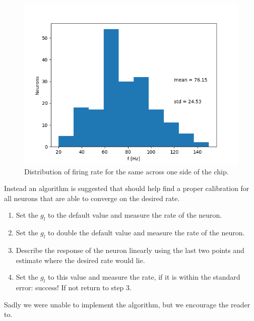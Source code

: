 \documentclass[10pt,a4paper]{article}
\begin{document}
\begin{figure}[ht]
    \centering
    \includegraphics[width=\textwidth]{figures/rate-distribution.png}
    \caption{Distribution of firing rate for the same across one side of the
    chip.}
    \label{fig:distribution}
\end{figure}

Instead an algorithm is suggested that should help find a proper calibration for
all neurons that are able to converge on the desired rate.
\begin{enumerate}
    \item Set the $g_l$ to the default value and measure the rate of the neuron.
    \item Set the $g_l$ to double the default value and measure the rate of the
        neuron.
    \item Describe the response of the neuron linearly using the last two
        points and estimate where the desired rate would lie.
    \item Set the $g_l$ to this value and measure the rate, if it is within the
        standard error: success! If not return to step 3.
\end{enumerate}
Sadly we were unable to implement the algorithm, but we encourage the reader
to.
\end{document}
